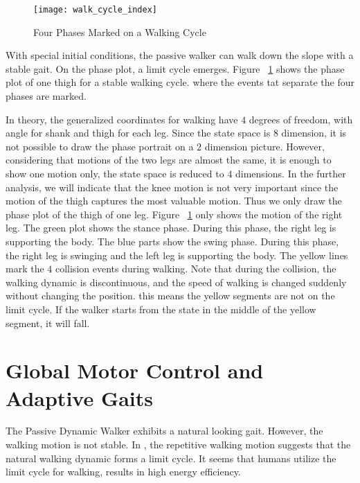 \begin{figure}[!htbp]
  \begin{center}
    \texttt{[image: walk\_cycle\_index]}
    \caption{Four Phases Marked on a Walking Cycle}
    \label{fig:phasesmaker}
\end{center}
\end{figure}

With special initial conditions, the passive walker can walk down the slope with a stable gait.
On the phase plot,  a limit cycle emerges. 
Figure ~\ref{fig:phasesmaker} shows the phase plot of one thigh for a stable walking cycle.
where the events tat separate the four phases are marked. 

In theory, the generalized coordinates for walking have $4$ degrees of freedom, with angle for shank and thigh for each leg.
Since the state space is $8$ dimension, it is not possible to draw the phase portrait on a $2$ dimension picture.
However, considering that motions of the two legs are almost the same, it is enough to show one motion only, the state space is reduced to $4$ dimensions.
In the further analysis, we will indicate that the knee motion is not very important since the motion of the thigh captures the most valuable motion.
Thus we only draw the phase plot of the thigh of one leg.
Figure ~\ref{fig:phasesmaker} only shows the motion of the right leg.
The green plot shows the stance phase. 
During this phase, the right leg is supporting the body.
The blue parts show the swing phase.
During this phase,  the right leg is swinging and the left leg is supporting the body.
The yellow lines mark the $4$ collision events during walking.
Note that during the collision, the walking dynamic is discontinuous, and the speed of walking is changed suddenly without changing the position.
this means the yellow segments are not on the limit cycle. 
If the walker starts from the state in the middle of the yellow segment, it will fall.











\section{Global Motor Control and Adaptive Gaits}
The Passive Dynamic Walker exhibits a natural looking gait.
However, the walking motion is not stable.
In \moit, the repetitive walking motion suggests that the natural walking dynamic forms a limit cycle.
It seems that humans utilize the limit cycle for walking,  results in high energy efficiency.

